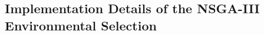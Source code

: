 \documentclass[a4paper,fleqn]{cas-sc}
\begin{document}
\subsection{Implementation Details of the NSGA-III Environmental Selection}\label{A.Evolution}



\end{document}
